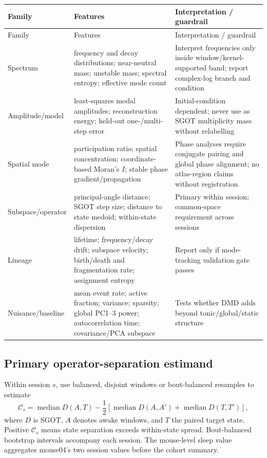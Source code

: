 \documentclass[11pt,a4paper]{article}
\begin{document}
\begin{longtable}{@{}P{0.19\textwidth}P{0.47\textwidth}P{0.26\textwidth}@{}}
\toprule
Family & Features & Interpretation / guardrail\\
\midrule
\endfirsthead
\toprule
Family & Features & Interpretation / guardrail\\
\midrule
\endhead
Spectrum & frequency and decay distributions; near-neutral mass; unstable mass; spectral entropy; effective mode count & Interpret frequencies only inside window/kernel-supported band; report complex-log branch and condition\\
Amplitude/model & least-squares modal amplitudes; reconstruction energy; held-out one-/multi-step error & Initial-condition dependent; never use as SGOT multiplicity mass without relabelling\\
Spatial mode & participation ratio; spatial concentration; coordinate-based Moran's $I$; stable phase gradient/propagation & Phase analyses require conjugate pairing and global phase alignment; no atlas-region claims without registration\\
Subspace/operator & principal-angle distance; SGOT step size; distance to state medoid; within-state dispersion & Primary within session; common-space requirement across sessions\\
Lineage & lifetime; frequency/decay drift; subspace velocity; birth/death and fragmentation rate; assignment entropy & Report only if mode-tracking validation gate passes\\
Nuisance/baseline & mean event rate; active fraction; variance; sparsity; global PC1--3 power; autocorrelation time; covariance/PCA subspace & Tests whether DMD adds beyond tonic/global/static structure\\
\bottomrule
\end{longtable}

\subsection{Primary operator-separation estimand}

Within session $s$, use balanced, disjoint windows or bout-balanced resamples to estimate
\begin{equation}
  \mathcal C_s=\operatorname{median}D(A,T)
  -\frac{1}{2}\left[\operatorname{median}D(A,A')+\operatorname{median}D(T,T')\right],
\end{equation}
where $D$ is SGOT, $A$ denotes awake windows, and $T$ the paired target state. Positive $\mathcal C_s$ means state separation exceeds within-state spread. Bout-balanced bootstrap intervals accompany each session. The mouse-level sleep value aggregates mouse04's two session values before the cohort summary.
\end{document}
